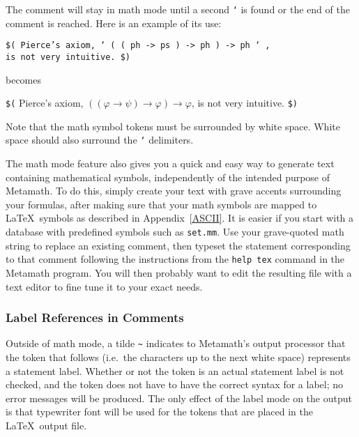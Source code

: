 The comment will stay in math mode until a second \texttt{`} is found or the end
of the comment is reached.  Here is an example of its use:
\begin{center}
\texttt{\$( Pierce's axiom, ` ( ( ph -> ps ) -> ph ) -> ph ` ,\\
         is not very intuitive. \$)}
\end{center}
becomes
\begin{center}
   \texttt{\$(} Pierce's axiom, $((\varphi \rightarrow \psi)\rightarrow
\varphi)\rightarrow \varphi$, is not very intuitive. \texttt{\$)}
\end{center}

Note that the math symbol tokens must be surrounded by white
space.
White space should also surround the \texttt{`}
delimiters.

The math mode feature also gives you a quick and easy way to generate
text containing mathematical symbols, independently of the intended
purpose of Metamath. To do this,
simply create your text with grave accents surrounding your formulas,
after making sure that your math symbols are mapped to \LaTeX\ symbols
as described in Appendix~\ref{ASCII}.  It is easier if you start with a
database with predefined symbols such as \texttt{set.mm}.  Use your
grave-quoted math string to replace an existing comment, then typeset
the statement corresponding to that comment following the instructions
from the \texttt{help tex} command in the Metamath program.  You will
then probably want to edit the resulting file with a text editor to fine
tune it to your exact needs.

\subsubsection{Label References in Comments}

Outside of math mode, a tilde \verb/~/
indicates to Metamath's output processor that the
token that follows (i.e.\ the characters up to the next
white space) represents a statement label.  Whether
or not the token is an actual statement label is not checked, and the
token does not have to have the correct syntax for a label; no error
messages will be produced.  The only effect of the label mode on the
output is that typewriter font will be used for the tokens that are
placed in the \LaTeX\ output file.


